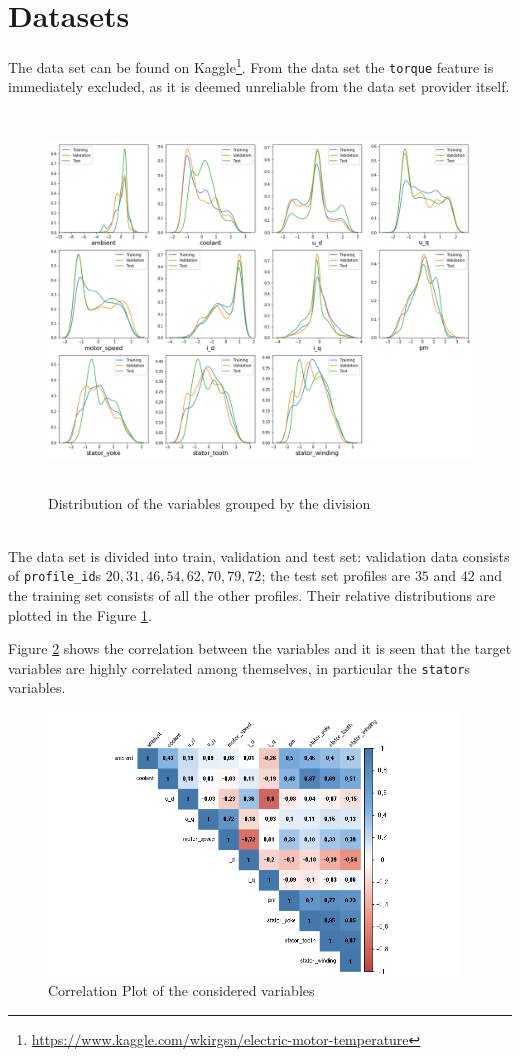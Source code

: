 \section{Datasets}
The data set can be found on Kaggle\footnote{\href{https://www.kaggle.com/wkirgsn/electric-motor-temperature}{https://www.kaggle.com/wkirgsn/electric-motor-temperature}}. From the data set the \verb|torque| feature is immediately excluded, as it is deemed unreliable from the data set provider itself.
\begin{figure}[!h]
    \centering
    \includegraphics[width=\linewidth, height=10cm]{imgs/dist_plot.png}
    \caption{Distribution of the variables grouped by the division}
    \label{fig:dist_plot}
\end{figure}\\
The data set is divided into train, validation and test set: validation data consists of \verb|profile_id|s $20, 31, 46, 54, 62, 70, 79, 72$; the test set profiles are $35$ and $42$ and the training set consists of all the other profiles. Their relative distributions are plotted in the Figure \ref{fig:dist_plot}.

Figure \ref{fig:corrplot} shows the correlation between the variables and it is seen that the target variables are highly correlated among themselves, in particular the \verb|stator|s variables.
\begin{figure}[!h]
    \centering
    \includegraphics[width=\linewidth, height=7cm]{imgs/corrplot.png}
    \caption{Correlation Plot of the considered variables}
    \label{fig:corrplot}
\end{figure}

